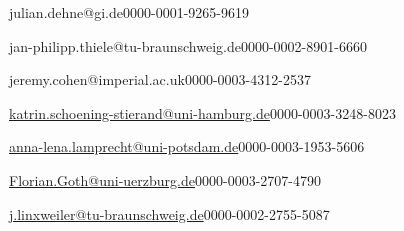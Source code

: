 


\author[1]{Julian Dehne}{julian.dehne@gi.de}{0000-0001-9265-9619}
\author[2]{Jan Philipp Thiele}{jan-philipp.thiele@tu-braunschweig.de}{0000-0002-8901-6660}
\author[3]{Jeremy Cohen}{jeremy.cohen@imperial.ac.uk}{0000-0003-4312-2537}
\author[4]{Katrin Schöning-Stierand}{\href{mailto:katrin.schoening-stierand@uni-hamburg.de}{katrin.schoening-stierand@uni-hamburg.de}}{0000-0003-3248-8023}
\author[5]{Anna-Lena Lamprecht}{\href{mailto:anna-lena.lamprecht@uni-potsdam.de}{anna-lena.lamprecht@uni-potsdam.de}}{0000-0003-1953-5606}
\author[6]{Florian Goth}{\href{mailto:Florian.Goth@uni-wuerzburg.de}{Florian.Goth@uni-uerzburg.de}}{0000-0003-2707-4790}
\author[7]{Jan Linxweiler}{\href{mailto:j.linxweiler@tu-braunschweig.de}{j.linxweiler@tu-braunschweig.de}}{0000-0002-2755-5087}

